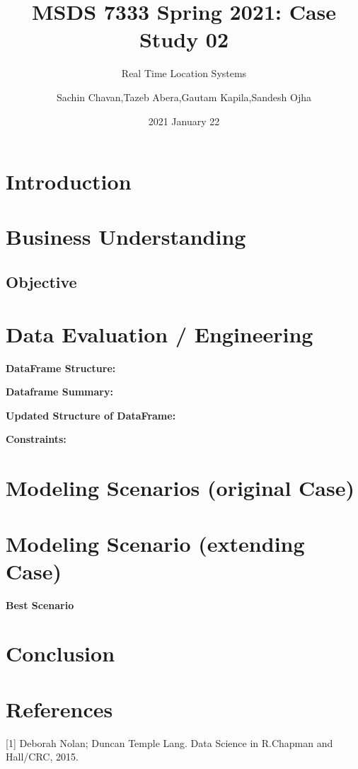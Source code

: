 \documentclass[
]{article}
\title{MSDS 7333 Spring 2021: Case Study 02}
\subtitle{Real Time Location Systems}
\author{Sachin Chavan,Tazeb Abera,Gautam Kapila,Sandesh Ojha}
\date{2021 January 22}
\begin{document}
\maketitle

\hypertarget{introduction}{%
\section{Introduction}\label{introduction}}

\hypertarget{business-understanding}{%
\section{Business Understanding}\label{business-understanding}}

\hypertarget{objective}{%
\subsection{Objective}\label{objective}}

\newpage

\hypertarget{data-evaluation-engineering}{%
\section{Data Evaluation /
Engineering}\label{data-evaluation-engineering}}

\textbf{DataFrame Structure:}

\textbf{Dataframe Summary:}

\textbf{Updated Structure of DataFrame:}

\newpage

\textbf{Constraints:}

\newpage

\hypertarget{modeling-scenarios-original-case}{%
\section{Modeling Scenarios (original
Case)}\label{modeling-scenarios-original-case}}

\newpage

\hypertarget{modeling-scenario-extending-case}{%
\section{Modeling Scenario (extending
Case)}\label{modeling-scenario-extending-case}}

\textbf{Best Scenario}

\newpage

\hypertarget{conclusion}{%
\section{Conclusion}\label{conclusion}}

\hypertarget{references}{%
\section{References}\label{references}}

\leavevmode\hypertarget{refs}{}%
{[}1{]} Deborah Nolan; Duncan Temple Lang. Data Science in R.Chapman and
Hall/CRC, 2015.
\end{document}
